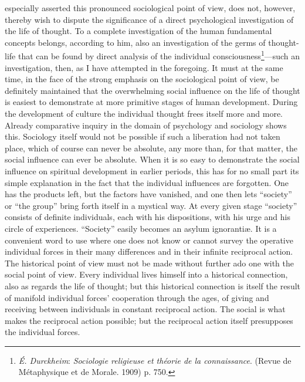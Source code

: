 \documentclass[12pt,a4paper]{book}
\newcommand{\opage}[1]{\marginnote{\footnotesize\textit{[#1]}}}
\begin{document}
especially asserted this pronounced sociological point of view, does not,
however, thereby wish to dispute the significance of a direct psychological
investigation of the life of thought. To a complete investigation of the
human fundamental concepts belongs, according to him, also an investigation
of the germs of thought-life that can be found by direct analysis of the
individual consciousness\footnote{\emph{É. Durckheim}: \emph{Sociologie
religieuse et théorie de la connaissance}. (Revue de Métaphysique et de
Morale. 1909) p. 750.}---such an investigation, then, as I have attempted
in the foregoing. It must at the same time, in the face of the strong
emphasis on the sociological point of view, be definitely maintained that
the overwhelming social influence on the life of thought is easiest to
demonstrate at more primitive stages of human development. During the
development of culture the individual thought frees itself more and more.
Already comparative inquiry in the domain of psychology and sociology shows
this. Sociology itself would not be possible if such a liberation had not
taken place, which of course can never be absolute, any more than, for that
matter, the social influence can ever be absolute. When it is so easy to
\opage{111}demonstrate the social influence on spiritual development in earlier
periods, this has for no small part its simple explanation in the fact that
the individual influences are forgotten. One has the products left, but the
factors have vanished, and one then lets ``society'' or ``the group'' bring
forth itself in a mystical way. At every given stage ``society'' consists
of definite individuals, each with his dispositions, with his urge and his
circle of experiences. ``Society'' easily becomes an asylum ignorantiæ. It
is a convenient word to use where one does not know or cannot survey the
operative individual forces in their many differences and in their infinite
reciprocal action. The historical point of view must not be made without
further ado one with the social point of view. Every individual lives
himself into a historical connection, also as regards the life of thought;
but this historical connection is itself the result of manifold individual
forces' cooperation through the ages, of giving and receiving between
individuals in constant reciprocal action. The social is what makes the
reciprocal action possible; but the reciprocal action itself presupposes
the individual forces.
\end{document}
